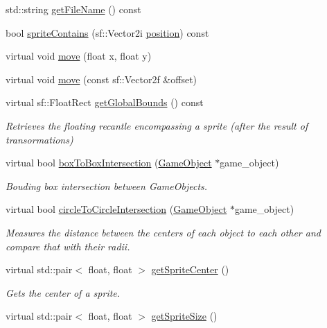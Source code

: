 \begin{DoxyCompactItemize}
std\+::string \hyperlink{class_game_object_a387e235ced0f778e58d5f4a39f58a220}{get\+File\+Name} () const 
\item 
bool \hyperlink{class_game_object_adf7e04407f7c2a5bd487b459efe9fd79}{sprite\+Contains} (sf\+::\+Vector2i \hyperlink{class_game_object_a86e4253e3734436b4a5a0c503e0033b4}{position}) const 
\item 
virtual void \hyperlink{class_game_object_a6fa0d948eccbd0345cda6bdea5b5196a}{move} (float x, float y)
\item 
virtual void \hyperlink{class_game_object_a3ad77a6b8bc1adfb8ea463f12c022b1e}{move} (const sf\+::\+Vector2f \&offset)
\item 
virtual sf\+::\+Float\+Rect \hyperlink{class_game_object_a3a1df73c1ffc15d9bb616aebc3e477fd}{get\+Global\+Bounds} () const 
\begin{DoxyCompactList}\small\item\em Retrieves the floating recantle encompassing a sprite (after the result of transormations) \end{DoxyCompactList}\item 
virtual bool \hyperlink{class_game_object_a18a09c750e617f7e3188bda15a7d5fd7}{box\+To\+Box\+Intersection} (\hyperlink{class_game_object}{Game\+Object} $\ast$game\+\_\+object)
\begin{DoxyCompactList}\small\item\em Bouding box intersection between Game\+Objects. \end{DoxyCompactList}\item 
virtual bool \hyperlink{class_game_object_a3a9fd4ee6157fcf61fd8f7d7318598c5}{circle\+To\+Circle\+Intersection} (\hyperlink{class_game_object}{Game\+Object} $\ast$game\+\_\+object)
\begin{DoxyCompactList}\small\item\em Measures the distance between the centers of each object to each other and compare that with their radii. \end{DoxyCompactList}\item 
virtual std\+::pair$<$ float, float $>$ \hyperlink{class_game_object_ad6d60e0c273cb0074c91a19f3aed8708}{get\+Sprite\+Center} ()
\begin{DoxyCompactList}\small\item\em Gets the center of a sprite. \end{DoxyCompactList}\item 
virtual std\+::pair$<$ float, float $>$ \hyperlink{class_game_object_a3731c03ddcbdb904bd41af78e09d262a}{get\+Sprite\+Size} ()

\end{DoxyCompactItemize}
